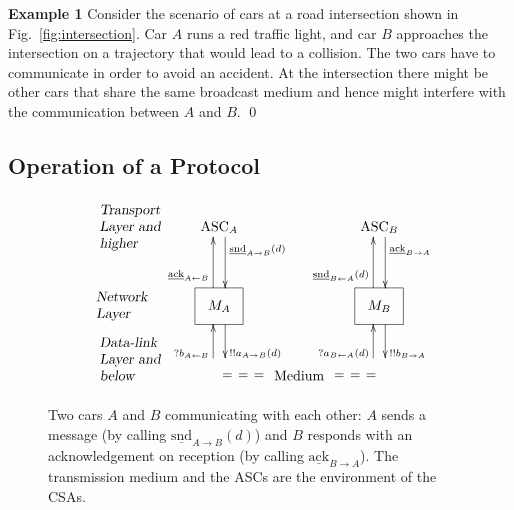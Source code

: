 \documentclass{sig-alternate}
\newenvironment{example}{\textbf{Example 1}}{\qed}
\newcommand{\locev}[1]{\underline{#1}}
\newcommand{\snd}{\mathrm{snd}}
\newcommand{\ack}{\mathrm{ack}}
\newcommand{\env}[4]{\locev{#1}_{{#2} \rightarrow {#3}}(#4)}
\newcommand{\eenv}[3]{\locev{#1}_{{#2} \rightarrow {#3}}}
\newcommand{\sys}[4]{\locev{#1}_{{#2} \leftarrow {#3}}(#4)}
\newcommand{\esys}[3]{\locev{#1}_{{#2} \leftarrow {#3}}}
\newcommand{\fig}[1]{Fig.\ \ref{fig:#1}}
\newcommand{\figvspace}{\vspace{-0.2in}}
\begin{document}
\begin{example}
Consider the scenario of cars at a road intersection shown in \fig{intersection}. Car $A$ runs a red traffic light, and car $B$ approaches the intersection on a trajectory that would lead to a collision. The two cars have to communicate in order to avoid an accident. At the intersection there might be other cars that share the same broadcast medium and hence might interfere with the communication between $A$ and $B$.
\end{example}




\subsection{Operation of a Protocol} \label{sec:protocol}


\begin{figure}
\centering
\begin{displaymath}
    \xymatrix@R=0.1cm@C=0.5cm{ {\begin{array}{l}\text{\sl Transport}\\\text{\sl Layer and}\\\text{\sl higher}\end{array}} & {\mathrm{ASC}_A} \ar@<1ex>[ddd]^<<<<{\env{\snd}{A}{B}{d}} & & {\mathrm{ASC}_B}  \ar@<1ex>[ddd]^<<<<{\eenv{\ack}{B}{A}} \\ \\ \\ {\begin{array}{l}\text{\sl Network}\\\text{\sl Layer {\phantom{anda}}}\end{array}} & *+++[][F]{M_A} \ar@<1ex>[d]^>>{!!a_{A \rightarrow B}(d)} \ar@<1ex>[uuu]^<<<<{\esys{\ack}{A}{B}} & & *+++[][F]{M_B} \ar@<1ex>[d]^>>{!!b_{B \rightarrow A}} \ar@<1ex>[uuu]^<<<<{\sys{\snd}{B}{A}{d}} \\ {\begin{array}{l}\text{\sl Data-link}\\\text{\sl Layer and}\\\text{\sl below}\end{array}} & {} \ar@<1ex>[u]^<<{?b_{A \leftarrow B}} & {\begin{array}{c}\\\\\text{Medium}\end{array}} \ar@<2.5ex>@{==}[l] \ar@<-2.5ex>@{==}[r] & {}\ar@<1ex>[u]^<<{?a_{B \leftarrow A}(d)}
    }
\end{displaymath}
\figvspace
\caption{Two cars $A$ and $B$ communicating with each other: $A$ sends a message (by calling $\env{\snd}{A}{B}{d}$) and $B$ responds with an acknowledgement on reception (by calling $\eenv{\ack}{B}{A}$). The transmission medium and the ASCs are the environment of the CSAs.}
\label{fig:cars}
\figvspace
\end{figure}
\end{document}

